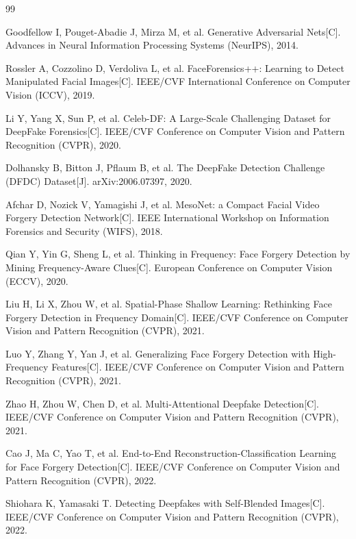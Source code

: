 \begin{thebibliography}{99}

 Goodfellow I, Pouget-Abadie J, Mirza M, et al. Generative Adversarial Nets[C]. Advances in Neural Information Processing Systems (NeurIPS), 2014.

 Rossler A, Cozzolino D, Verdoliva L, et al. FaceForensics++: Learning to Detect Manipulated Facial Images[C]. IEEE/CVF International Conference on Computer Vision (ICCV), 2019.

 Li Y, Yang X, Sun P, et al. Celeb-DF: A Large-Scale Challenging Dataset for DeepFake Forensics[C]. IEEE/CVF Conference on Computer Vision and Pattern Recognition (CVPR), 2020.

 Dolhansky B, Bitton J, Pflaum B, et al. The DeepFake Detection Challenge (DFDC) Dataset[J]. arXiv:2006.07397, 2020.

 Afchar D, Nozick V, Yamagishi J, et al. MesoNet: a Compact Facial Video Forgery Detection Network[C]. IEEE International Workshop on Information Forensics and Security (WIFS), 2018.

 Qian Y, Yin G, Sheng L, et al. Thinking in Frequency: Face Forgery Detection by Mining Frequency-Aware Clues[C]. European Conference on Computer Vision (ECCV), 2020.

 Liu H, Li X, Zhou W, et al. Spatial-Phase Shallow Learning: Rethinking Face Forgery Detection in Frequency Domain[C]. IEEE/CVF Conference on Computer Vision and Pattern Recognition (CVPR), 2021.

 Luo Y, Zhang Y, Yan J, et al. Generalizing Face Forgery Detection with High-Frequency Features[C]. IEEE/CVF Conference on Computer Vision and Pattern Recognition (CVPR), 2021.

 Zhao H, Zhou W, Chen D, et al. Multi-Attentional Deepfake Detection[C]. IEEE/CVF Conference on Computer Vision and Pattern Recognition (CVPR), 2021.

 Cao J, Ma C, Yao T, et al. End-to-End Reconstruction-Classification Learning for Face Forgery Detection[C]. IEEE/CVF Conference on Computer Vision and Pattern Recognition (CVPR), 2022.

 Shiohara K, Yamasaki T. Detecting Deepfakes with Self-Blended Images[C]. IEEE/CVF Conference on Computer Vision and Pattern Recognition (CVPR), 2022.


\end{thebibliography}
